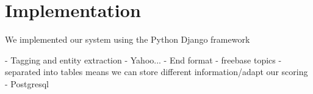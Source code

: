 \section{Implementation}
\label{sec:implementation}

We implemented our system using the Python Django framework

- Tagging and entity extraction - Yahoo...
- End format - freebase topics
- separated into tables means we can store different information/adapt our
scoring
- Postgresql
